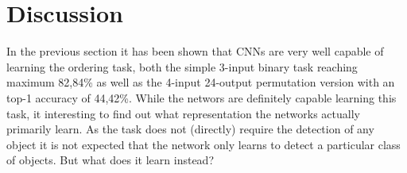 %
\newpage
\chapter{Discussion}
\label{ch:discussion}
In the previous section it has been shown that CNNs are very well capable of learning the ordering task, both the simple 3-input binary task reaching maximum 82,84\% as well as the 4-input 24-output permutation version with an top-1 accuracy of 44,42\%. While the networs are definitely capable learning this task, it interesting to find out what representation the networks actually primarily learn. As the task does not (directly) require the detection of any object it is not expected that the network only learns to detect a particular class of objects. But what does it learn instead?

% 
